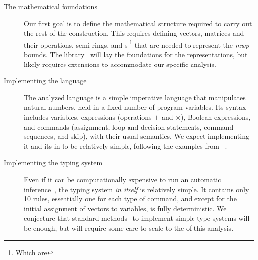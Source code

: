 \begin{description}

\item[The mathematical foundations]
Our first goal is to define the mathematical structure required to carry out the
rest of the construction. This requires defining vectors, matrices and their
operations, semi-rings, and s%
\footnote{Which are }
that are needed to represent the \emph{mwp}-bounds.
The  library~\cite{mahboubi2022,mathcomp} will lay
the foundations for the  representations, but likely requires
extensions to accommodate our specific analysis.

\item[Implementing the language]
The analyzed language is a simple imperative language that manipulates natural
numbers, held in a fixed number of program variables. Its syntax includes
variables, expressions (operations \(+\) and \(\times\)), Boolean expressions,
and commands (\eg  assignment, loop and decision statements, command sequences,
and skip), with their usual semantics. We expect implementing it and its
 in  to be relatively simple, following the
examples from ~\cite{cpierce20221,cpierce20222}.

\item[Implementing the typing system]
Even if it can be computationally expensive to run an automatic
inference~\cite{aubert2023b}, the typing system \emph{in
itself} is relatively simple. It contains only 10 rules, essentially one for
each type of command, and except for the initial assignment of vectors to
variables, is fully deterministic. We conjecture that standard
methods~\cite{chlipala2022, chlipala2010} to implement simple type systems will
be enough, but will require some care to scale to the  of this analysis.


\end{description}
